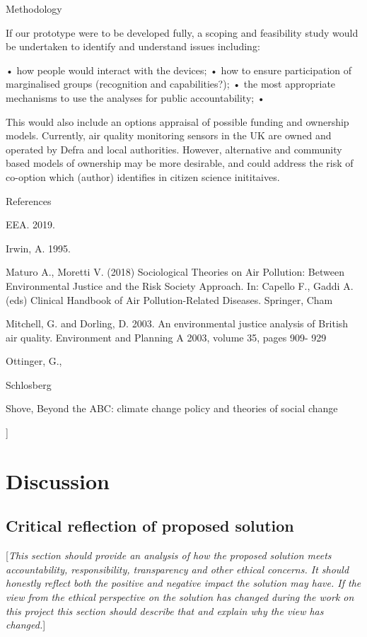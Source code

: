 \documentclass[10pt,english, openany]{book}
\begin{document}
{Methodology 

If our prototype were to be developed fully, a scoping and feasibility study would be undertaken to identify and understand issues including: 

•	how people would interact with the devices;
•	how to ensure participation of marginalised groups (recognition and capabilities?);
•	the most appropriate mechanisms to use the analyses for public accountability; 
•	

This would also include an options appraisal of possible funding and ownership models. Currently, air quality monitoring sensors in the UK are owned and operated by Defra and local authorities. However, alternative and community based models of ownership may be more desirable, and could address the risk of co-option which (author) identifies in citizen science inititaives. 

References 

EEA. 2019.  

Irwin, A. 1995. 

Maturo A., Moretti V. (2018) Sociological Theories on Air Pollution: Between Environmental Justice and the Risk Society Approach. In: Capello F., Gaddi A. (eds) Clinical Handbook of Air Pollution-Related Diseases. Springer, Cham 

Mitchell, G. and Dorling, D. 2003. An environmental justice analysis of British air quality. Environment and Planning A 2003, volume 35, pages 909- 929 

Ottinger, G., 

Schlosberg 

Shove, Beyond the ABC: climate change policy and theories of social change
}]

\chapter{Discussion}\label{chapt:results}
\section{Critical reflection of proposed solution}
[\textit{This section should provide an analysis of how the proposed solution meets accountability, responsibility, transparency and other ethical concerns. It should honestly reflect both the positive and negative impact the solution may have. If the view from the ethical perspective on the solution has changed during the work on this project this section should describe that and explain why the view has changed.}]
\end{document}
